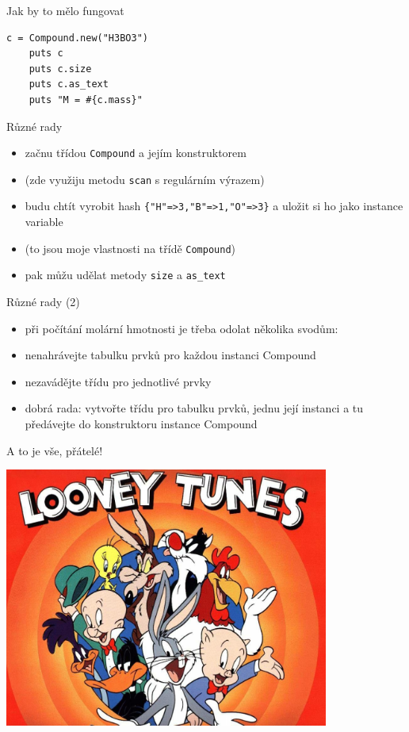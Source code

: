\documentclass{beamer}
\begin{document}
\begin{frame}[fragile]{Jak by to mělo fungovat}
  \begin{Verbatim}[fontsize=\small]
    c = Compound.new("H3BO3")
    puts c
    puts c.size
    puts c.as_text
    puts "M = #{c.mass}"
  \end{Verbatim}
\end{frame}


\begin{frame}[fragile]{Různé rady}
  \begin{itemize}
    \item začnu třídou \texttt{Compound} a jejím konstruktorem
    \item (zde využiju metodu \texttt{scan} s regulárním výrazem)
    \item budu chtít vyrobit hash \verb|{"H"=>3,"B"=>1,"O"=>3}| a uložit si ho jako instance variable
    \item (to jsou moje vlastnosti na třídě \texttt{Compound})
    \item pak můžu udělat metody \texttt{size} a \texttt{as\_text}
  \end{itemize}
\end{frame}

\begin{frame}[fragile]{Různé rady (2)}
  \begin{itemize}
    \item při počítání molární hmotnosti je třeba odolat několika svodům:
    \item nenahrávejte tabulku prvků pro každou instanci Compound
    \item nezavádějte třídu pro jednotlivé prvky
    \item dobrá rada: vytvořte třídu pro tabulku prvků, jednu její instanci a tu předávejte do konstruktoru instance Compound
  \end{itemize}
\end{frame}

\begin{frame}{A to je vše, přátelé!}
  \begin{center}
    \includegraphics[width=0.8\textwidth]{looney_tunes}
  \end{center}
\end{frame}
\end{document}
